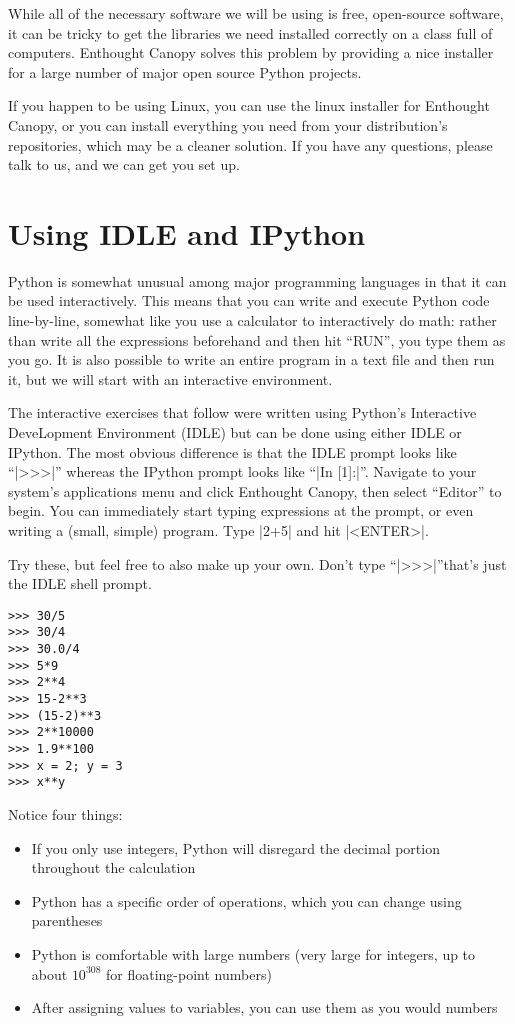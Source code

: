 \documentclass{article}
\begin{document}
While all of the necessary software we will be using is free, open-source software, it can be tricky to get the libraries we need installed correctly on a class full of computers. Enthought Canopy solves this problem by providing a nice installer for a large number of major open source Python projects.

If you happen to be using Linux, you can use the linux installer for Enthought Canopy, or you can install everything you need from your distribution's repositories, which may be a cleaner solution.  If you have any questions, please talk to us, and we can get you set up.

\section{Using IDLE and IPython}
Python is somewhat unusual among major programming languages in that it can be used interactively.  This means that you can write and execute Python code line-by-line, somewhat like you use a calculator to interactively do math: rather than write all the expressions beforehand and then hit ``RUN'', you type them as you go.  It is also possible to write an entire program in a text file and then run it, but we will start with an interactive environment.

\pagebreak
The interactive exercises that follow were written using Python's Interactive DeveLopment Environment (IDLE) but can be done using either IDLE or IPython.  The most obvious difference is that the IDLE prompt looks like ``|>>>|'' whereas the IPython prompt looks like ``|In [1]:|''. Navigate to your system's applications menu and click Enthought Canopy, then select ``Editor'' to begin.  You can immediately start typing expressions at the prompt, or even writing a (small, simple)
program.  Type |2+5| and hit |<ENTER>|.

Try these, but feel free to also make up your own.  Don't type
``|>>>|''\textemdash that's just the IDLE shell prompt.
\begin{Verbatim}
>>> 30/5
>>> 30/4
>>> 30.0/4
>>> 5*9
>>> 2**4
>>> 15-2**3
>>> (15-2)**3
>>> 2**10000
>>> 1.9**100
>>> x = 2; y = 3
>>> x**y
\end{Verbatim}

Notice four things:
\begin{itemize}
 \item If you only use integers, Python will disregard the decimal portion throughout the calculation
 \item Python has a specific order of operations, which you can change using parentheses
 \item Python is comfortable with large numbers (very large for integers, up to
about $10^{308}$ for floating-point numbers)
 \item After assigning values to variables, you can use them as you would numbers
\end{itemize}
\end{document}
